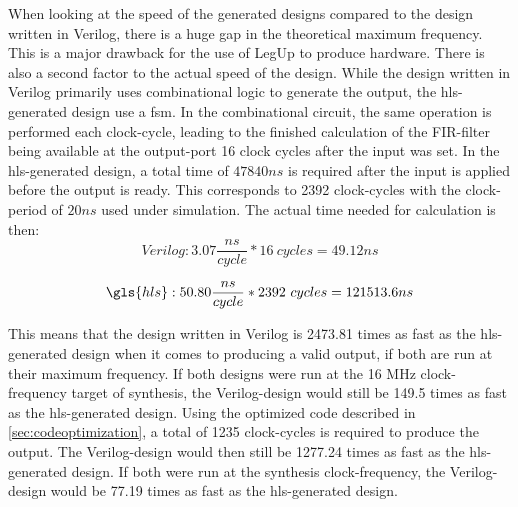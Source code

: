 When looking at the speed of the generated designs compared to the design written in Verilog, there is a huge gap in the theoretical maximum frequency. This is a major drawback for the use of LegUp to produce hardware. There is also a second factor to the actual speed of the design. While the design written in Verilog primarily uses combinational logic to generate the output, the \gls{hls}-generated design use a \gls{fsm}. In the combinational circuit, the same operation is performed each clock-cycle, leading to the finished calculation of the FIR-filter being available at the output-port 16 clock cycles after the input was set. In the \gls{hls}-generated design, a total time of $47840 ns$ is required after the input is applied before the output is ready. This corresponds to 2392 clock-cycles with the clock-period of $20 ns$ used under simulation. The actual time needed for calculation is then:
\begin{equation*}
    Verilog: 3.07 \frac{ns}{cycle}*16~cycles = 49.12 ns
\end{equation*}

\begin{equation*}
    \gls{hls}: 50.80 \frac{ns}{cycle}*2392~cycles = 121513.6 ns
\end{equation*}

This means that the design written in Verilog is 2473.81 times as fast as the \gls{hls}-generated design when it comes to producing a valid output, if both are run at their maximum frequency. If both designs were run at the 16 MHz clock-frequency target of synthesis, the Verilog-design would still be 149.5 times as fast as the \gls{hls}-generated design. Using the optimized code described in \cref{sec:codeoptimization}, a total of 1235 clock-cycles is required to produce the output. The Verilog-design would then still be 1277.24 times as fast as the \gls{hls}-generated design. If both were run at the synthesis clock-frequency, the Verilog-design would be 77.19 times as fast as the \gls{hls}-generated design.

